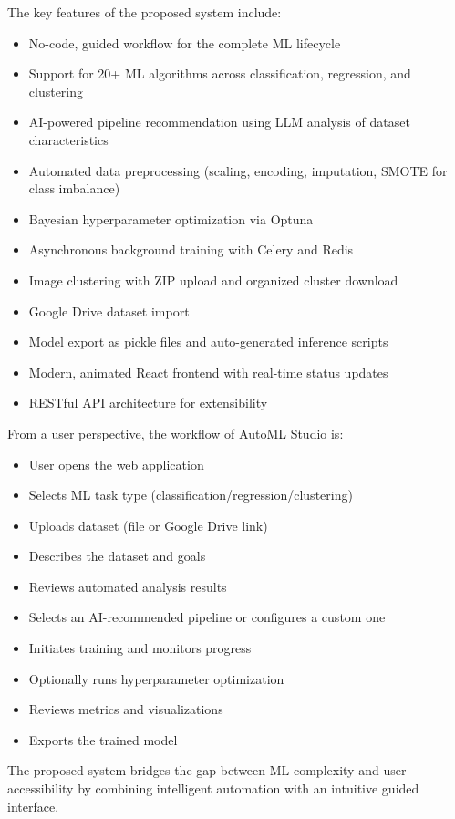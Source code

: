 \documentclass[12pt,a4paper]{report}
\begin{document}
The key features of the proposed system include:
\begin{itemize}
\item No-code, guided workflow for the complete ML lifecycle
\item Support for 20+ ML algorithms across classification, regression, and clustering
\item AI-powered pipeline recommendation using LLM analysis of dataset characteristics
\item Automated data preprocessing (scaling, encoding, imputation, SMOTE for class imbalance)
\item Bayesian hyperparameter optimization via Optuna
\item Asynchronous background training with Celery and Redis
\item Image clustering with ZIP upload and organized cluster download
\item Google Drive dataset import
\item Model export as pickle files and auto-generated inference scripts
\item Modern, animated React frontend with real-time status updates
\item RESTful API architecture for extensibility
\end{itemize}

From a user perspective, the workflow of AutoML Studio is:
\begin{itemize}
\item User opens the web application
\item Selects ML task type (classification/regression/clustering)
\item Uploads dataset (file or Google Drive link)
\item Describes the dataset and goals
\item Reviews automated analysis results
\item Selects an AI-recommended pipeline or configures a custom one
\item Initiates training and monitors progress
\item Optionally runs hyperparameter optimization
\item Reviews metrics and visualizations
\item Exports the trained model
\end{itemize}

The proposed system bridges the gap between ML complexity and user accessibility by combining intelligent automation with an intuitive guided interface.
\end{document}
